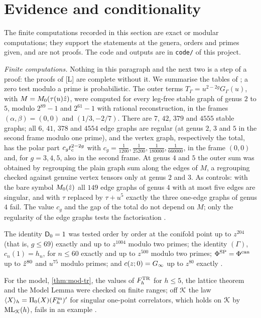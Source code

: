 \section{Evidence and conditionality}
\label{sec:evi}
\noindent{} The finite computations recorded in this section are exact or modular computations; they support the statements at the genera, orders and primes given, and are not proofs. The code and outputs are in \texttt{code/} of this project.


\emph{Finite computations.} Nothing in this paragraph and the next two is a step of a proof: the proofs of [L] are complete without it. We summarise the tables of ; a zero test modulo a prime is probabilistic. The outer terms $T_\Gamma=u^{2-2g}G_\Gamma(u)$, with $M=M_{0}(\tau(u)\hat{z})$, were computed for every leg-free stable graph of genus $2$ to $5$, modulo $2^{89}-1$ and $2^{61}-1$ with rational reconstruction, in the frames $(\alpha,\beta)=(0,0)$ and $(1/3,-2/7)$. There are $7$, $42$, $379$ and $4555$ stable graphs; all $6$, $41$, $378$ and $4554$ edge graphs are regular (at genus $2$, $3$ and $5$ in the second frame modulo one prime), and the vertex graph, respectively the total, has the polar part $c_gt_{\mathrm{c}}^{2-2g}$ with $c_g=\frac1{1200},\frac1{25200},\frac1{180000},\frac1{660000}$, in the frame $(0,0)$ and, for $g=3,4,5$, also in the second frame. At genus $4$ and $5$ the outer sum was obtained by regrouping the plain graph sum along the edges of $M$, a regrouping checked against genuine vertex tensors only at genus $2$ and $3$. As controls: with the bare symbol $M_{0}(\hat{z})$ all $149$ edge graphs of genus $4$ with at most five edges are singular, and with $\tau$ replaced by $\tau+u^5$ exactly the three one-edge graphs of genus $4$ fail. The value $c_g$ and the gap of the total do not depend on $M$; only the regularity of the edge graphs tests the factorisation .

The identity $\mathsf{D}_0=1$ was tested order by order at the conifold point up to $z^{204}$ (that is, $g\leq69$) exactly and up to $z^{1004}$ modulo two primes; the identity $(\Gamma)$, $c_n(1)=h_n$, for $n\leq60$ exactly and up to $z^{500}$ modulo two primes; $\Phi^{\mathrm{SP}}=\Phi^{\mathrm{can}}$ up to $\hat{z}^{80}$ and $u^{75}$ modulo primes; and $c(z;0)=G_{\infty}$ up to $z^{80}$ exactly .

For the model, \cref{thm:mod-tr}, the values of $F^{\mathrm{TR}}_h$ for $h\leq5$, the lattice theorem and the Model Lemma were checked on finite ranges; off $\mathcal{K}$ the law $\langle X\rangle_h=\Pi_0(X)(F^{\mathrm{m}}_h)'$ for singular one-point correlators, which holds on $\mathcal{K}$ by $\mathrm{ML}_{\mathcal{K}}(h)$, fails in an example .

